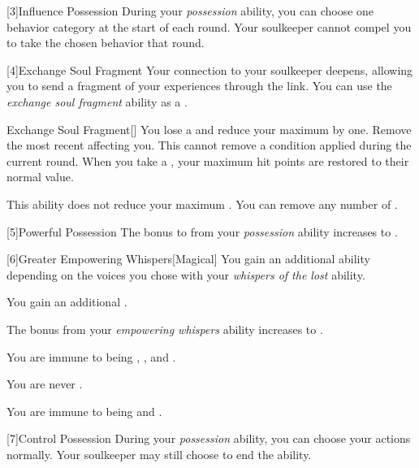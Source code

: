         [3]{Influence Possession} During your \textit{possession} ability, you can choose one behavior category at the start of each round.
        Your soulkeeper cannot compel you to take the chosen behavior that round.

        [4]{Exchange Soul Fragment} Your connection to your soulkeeper deepens, allowing you to send a fragment of your experiences through the link.
        You can use the \textit{exchange soul fragment} ability as a .
        \begin{freeability}{Exchange Soul Fragment}[]
            You lose a  and reduce your maximum  by one.
            Remove the most recent  affecting you.
            This cannot remove a condition applied during the current round.
            When you take a , your maximum hit points are restored to their normal value.

            \rankline
             This ability does not reduce your maximum .
             You can remove any number of .
        \end{freeability}

        [5]{Powerful Possession} The bonus to  from your \textit{possession} ability increases to .

        [6]{Greater Empowering Whispers}[Magical] You gain an additional ability depending on the voices you chose with your \textit{whispers of the lost} ability.
        {
             You gain an additional .

             The bonus from your \textit{empowering whispers} ability increases to .

             You are immune to being , , and .

             You are never .

             You are immune to being  and .
        }

        [7]{Control Possession} During your \textit{possession} ability, you can choose your actions normally.
        Your soulkeeper may still choose to end the ability.

